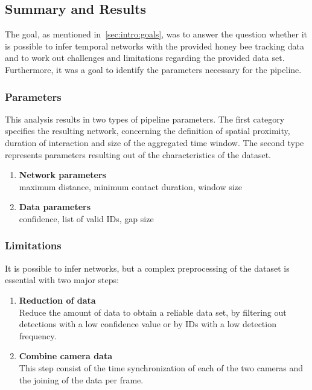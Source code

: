 \clearpage
\subsection{Summary and Results}
The goal, as mentioned in~\ref{sec:intro:goals}, was to answer the question whether it is possible to infer temporal networks with the provided honey bee tracking data and to work out challenges and limitations regarding the provided data set. Furthermore, it was a goal to identify the parameters necessary for the pipeline.

\subsubsection{Parameters}
This analysis results in two types of pipeline parameters. The first category specifies the resulting network, concerning the definition of spatial proximity, duration of interaction and size of the aggregated time window. The second type represents parameters resulting out of the characteristics of the dataset.

\begin{enumerate}
\item \textbf{Network parameters}\\
maximum distance, minimum contact duration, window size
\item \textbf{Data parameters}\\
confidence, list of valid IDs, gap size
\end{enumerate}


\subsubsection{Limitations}
It is possible to infer networks, but a complex preprocessing of the dataset is essential with two major steps:

\begin{enumerate}
\item \textbf{Reduction of data}\\
Reduce the amount of data to obtain a reliable data set, by filtering out detections with a low confidence value or by IDs with a low detection frequency.
\item \textbf{Combine camera data}\\
This step consist of the time synchronization of each of the two cameras and the joining of the data per frame.
\end{enumerate}

